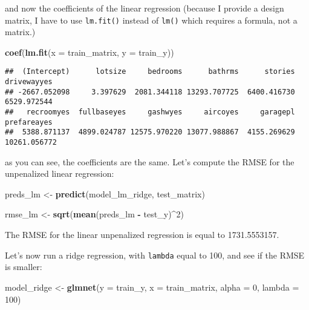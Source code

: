 \documentclass[
]{article}
\newenvironment{Shaded}{\begin{snugshade}}{\end{snugshade}}
\newcommand{\DataTypeTok}[1]{\textcolor[rgb]{0.13,0.29,0.53}{#1}}
\newcommand{\DecValTok}[1]{\textcolor[rgb]{0.00,0.00,0.81}{#1}}
\newcommand{\KeywordTok}[1]{\textcolor[rgb]{0.13,0.29,0.53}{\textbf{#1}}}
\newcommand{\NormalTok}[1]{#1}
\newcommand{\OperatorTok}[1]{\textcolor[rgb]{0.81,0.36,0.00}{\textbf{#1}}}
\newcommand{\StringTok}[1]{\textcolor[rgb]{0.31,0.60,0.02}{#1}}
\begin{document}
and now the coefficients of the linear regression (because I provide a design matrix, I have to use
\texttt{lm.fit()} instead of \texttt{lm()} which requires a formula, not a matrix.)

\begin{Shaded}
\begin{Highlighting}[]
\KeywordTok{coef}\NormalTok{(}\KeywordTok{lm.fit}\NormalTok{(}\DataTypeTok{x =}\NormalTok{ train\_matrix, }\DataTypeTok{y =}\NormalTok{ train\_y))}
\end{Highlighting}
\end{Shaded}

\begin{verbatim}
##  (Intercept)      lotsize     bedrooms      bathrms      stories  drivewayyes 
## -2667.052098     3.397629  2081.344118 13293.707725  6400.416730  6529.972544 
##   recroomyes  fullbaseyes     gashwyes     aircoyes     garagepl  prefareayes 
##  5388.871137  4899.024787 12575.970220 13077.988867  4155.269629 10261.056772
\end{verbatim}

as you can see, the coefficients are the same. Let's compute the RMSE for the unpenalized linear
regression:

\begin{Shaded}
\begin{Highlighting}[]
\NormalTok{preds\_lm \textless{}{-}}\StringTok{ }\KeywordTok{predict}\NormalTok{(model\_lm\_ridge, test\_matrix)}

\NormalTok{rmse\_lm \textless{}{-}}\StringTok{ }\KeywordTok{sqrt}\NormalTok{(}\KeywordTok{mean}\NormalTok{(preds\_lm }\OperatorTok{{-}}\StringTok{ }\NormalTok{test\_y)}\OperatorTok{\^{}}\DecValTok{2}\NormalTok{)}
\end{Highlighting}
\end{Shaded}

The RMSE for the linear unpenalized regression is equal to 1731.5553157.

Let's now run a ridge regression, with \texttt{lambda} equal to 100, and see if the RMSE is smaller:

\begin{Shaded}
\begin{Highlighting}[]
\NormalTok{model\_ridge \textless{}{-}}\StringTok{ }\KeywordTok{glmnet}\NormalTok{(}\DataTypeTok{y =}\NormalTok{ train\_y, }\DataTypeTok{x =}\NormalTok{ train\_matrix, }\DataTypeTok{alpha =} \DecValTok{0}\NormalTok{, }\DataTypeTok{lambda =} \DecValTok{100}\NormalTok{)}
\end{Highlighting}
\end{Shaded}
\end{document}
